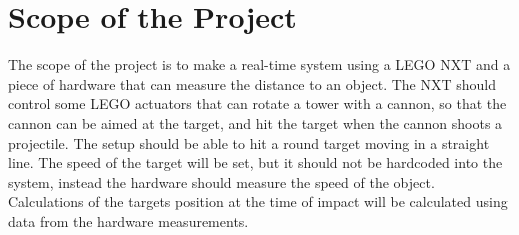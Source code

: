 \section{Scope of the Project}
The scope of the project is to make a real-time system using a LEGO NXT and a piece of hardware that can measure the distance to an object. The NXT should control some LEGO actuators that can rotate a tower with a cannon, so that the cannon can be aimed at the target, and hit the target when the cannon shoots a projectile. The setup should be able to hit a round target moving in a straight line. The speed of the target will be set, but it should not be hardcoded into the system, instead the hardware should measure the speed of the object. Calculations of the targets position at the time of impact will be calculated using data from the hardware measurements.
